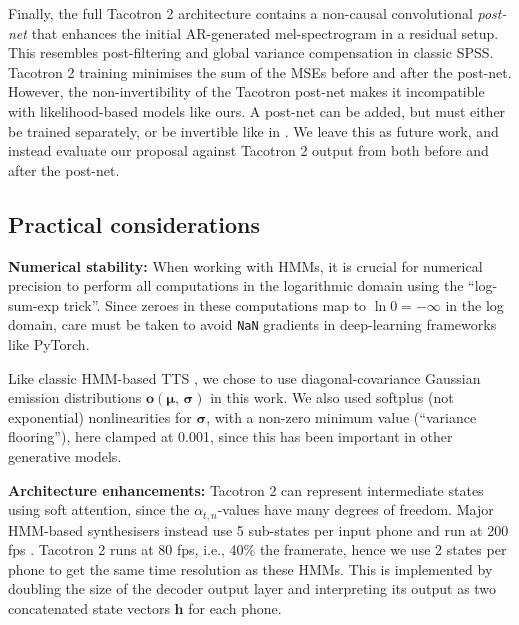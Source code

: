 \documentclass[british]{article}
\newcommand{\bb}[1]{\boldsymbol{#1}}
\begin{document}
Finally, the full Tacotron 2 architecture contains a non-causal convolutional \emph{post-net} that enhances the initial AR-generated mel-spectrogram in a residual setup.
This
resembles post-filtering and global variance compensation \cite{toda2007speech} in classic SPSS.
Tacotron 2 training minimises the sum of the MSEs before and after the post-net.
However, the non-invertibility of the Tacotron post-net makes it incompatible with likelihood-based models like ours.
A post-net can be added, but must either be trained separately,
or be invertible like in \cite{kim2020glow}.
We leave this as future work,
and instead evaluate our proposal against Tacotron 2 output from both before and after the post-net.













\subsection{Practical considerations}
\label{ssec:implementation}
\textbf{Numerical stability:}
When working with HMMs, it is crucial for numerical precision to perform all computations in the logarithmic domain
using the ``log-sum-exp trick''.
Since zeroes in these computations map to $\ln0=-\infty$ in the log domain,
care must be taken
to avoid \texttt{NaN} gradients in deep-learning frameworks like PyTorch.


Like classic HMM-based TTS \cite{zen2009statistical}, we chose to use diagonal-covariance Gaussian emission distributions $\bb{o}(\bb{\mu},\,\bb{\sigma})$ in this work.
We also used softplus (not exponential) nonlinearities for $\bb{\sigma}$, with a non-zero minimum value (``variance flooring''), here clamped at 0.001, since this has been important in other generative models.


\textbf{Architecture enhancements:}
Tacotron 2 can represent intermediate states using soft attention, since the $\alpha_{t,n}$-values have many degrees of freedom.
Major HMM-based synthesisers instead use 5 sub-states per input phone and run at 200 fps \cite{zen2009statistical,wu2016merlin}.
Tacotron 2 runs at 80 fps, i.e., 40\% the framerate, hence we use 2 states per phone to get the same time resolution as these HMMs.
This is implemented by doubling the size of the decoder output layer and interpreting its output as two concatenated state vectors $\bb{h}$ for each phone.
\end{document}
